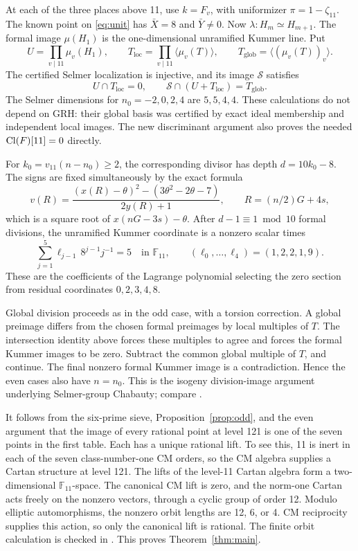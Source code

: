 \documentclass[11pt]{article}
\newcommand{\F}{\mathbb F}\newcommand{\OO}{\mathcal O}
\begin{document}
At each of the three places above 11, use \(k=F_v\), with uniformizer
\(\pi=1-\zeta_{11}\). The known point on \eqref{eq:unit} has
\(\bar X=8\) and \(\bar Y\ne0\). Now
\(\lambda:H_m\simeq H_{m+1}\). The formal image \(\mu(H_1)\) is the
one-dimensional unramified Kummer line. Put
\[
 U=\prod_{v\mid11}\mu_v(H_1),\qquad
 T_{\mathrm{loc}}=\prod_{v\mid11}\langle\mu_v(T)\rangle,\qquad
 T_{\mathrm{glob}}=\langle(\mu_v(T))_v\rangle.
\]
The certified Selmer localization is injective, and its image
\(\mathcal S\) satisfies
\[
 U\cap T_{\mathrm{loc}}=0,\qquad
 \mathcal S\cap(U+T_{\mathrm{loc}})=T_{\mathrm{glob}}.
\]
The Selmer dimensions for \(n_0=-2,0,2,4\) are \(5,5,4,4\).
These calculations do not depend on GRH: their global basis was
certified by exact ideal membership and independent local images.
The new discriminant argument also proves the needed
\(\operatorname{Cl}(F)[11]=0\) directly.

For \(k_0=v_{11}(n-n_0)\ge2\), the corresponding divisor has depth
\(d=10k_0-8\). The signs are fixed simultaneously by the exact formula
\[
 v(R)=\frac{(x(R)-\theta)^2-(3\theta^2-2\theta-7)}{2y(R)+1},
 \qquad R=(n/2)G+4s,
\]
which is a square root of \(x(nG-3s)-\theta\).
After \(d-1\equiv1\bmod10\) formal divisions, the unramified Kummer
coordinate is a nonzero scalar times
\[
 \sum_{j=1}^5\ell_{j-1}\,8^{j-1}j^{-1}=5\quad\text{in }\F_{11},
 \qquad (\ell_0,\ldots,\ell_4)=(1,2,2,1,9).
\]
These are the coefficients of the Lagrange polynomial selecting the
zero section from residual coordinates \(0,2,3,4,8\).

Global division proceeds as in the odd case, with a torsion correction.
A global preimage differs from the chosen formal preimages by local
multiples of \(T\). The intersection identity above forces these
multiples to agree and forces the formal Kummer images to be zero.
Subtract the common global multiple of \(T\), and continue. The final
nonzero formal Kummer image is a contradiction. Hence the even cases
also have \(n=n_0\). This is the isogeny division-image argument
underlying Selmer-group Chabauty; compare \cite{Stoll}.

It follows from the six-prime sieve, Proposition~\ref{prop:odd}, and
the even argument that the image of every rational point at level 121
is one of the seven points in the first table.
Each has a unique rational lift. To see this, 11 is inert in each of
the seven class-number-one CM orders, so the CM algebra supplies a
Cartan structure at level 121. The lifts of the level-11 Cartan algebra
form a two-dimensional \(\F_{11}\)-space. The canonical CM lift is
zero, and the norm-one Cartan acts freely on the nonzero vectors,
through a cyclic group of order 12. Modulo elliptic automorphisms,
the nonzero orbit lengths are 12, 6, or 4. CM reciprocity supplies
this action, so only the canonical lift is rational. The finite orbit
calculation is checked in .
This proves Theorem~\ref{thm:main}.
\end{document}

